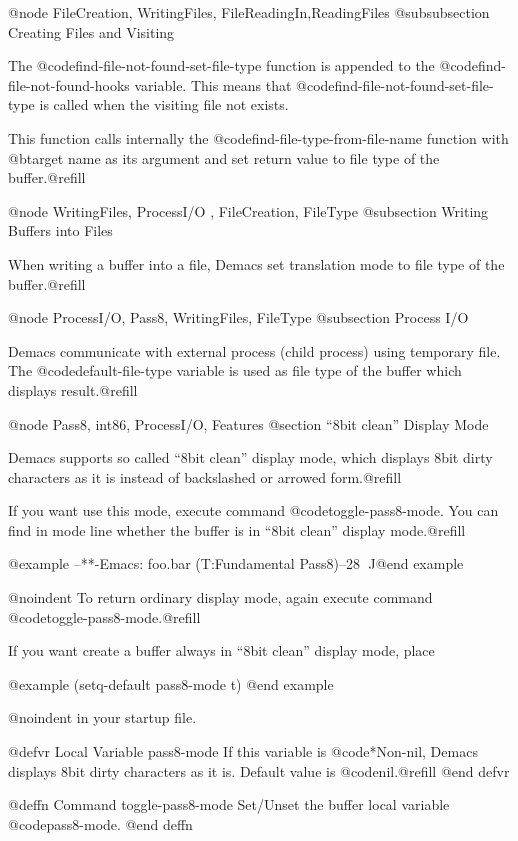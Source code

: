 @node FileCreation, WritingFiles, FileReadingIn,ReadingFiles
@subsubsection Creating Files and Visiting

The @code{find-file-not-found-set-file-type} function is appended to
the @code{find-file-not-found-hooks} variable. This means that
@code{find-file-not-found-set-file-type} is called when the visiting
file not exists.

This function calls internally the @code{find-file-type-from-file-name}
function with @b{target name} as its argument and set return value to
file type of the buffer.@refill


@node WritingFiles, ProcessI/O , FileCreation, FileType
@subsection Writing Buffers into Files

When writing a buffer into a file, Demacs set translation mode to
file type of the buffer.@refill


@node ProcessI/O, Pass8, WritingFiles, FileType
@subsection Process I/O

Demacs communicate with external process (child process) using temporary
file. The @code{default-file-type} variable is used as file type of
the buffer which displays result.@refill


@node Pass8, int86, ProcessI/O, Features
@section ``8bit clean'' Display Mode

Demacs supports so called ``8bit clean'' display mode, which displays
8bit dirty characters as it is instead of backslashed or arrowed
form.@refill

If you want use this mode, execute command @code{toggle-pass8-mode}. You
can find in mode line whether the buffer is in ``8bit clean'' display
mode.@refill

@example
--**-Emacs: foo.bar      (T:Fundamental Pass8)--28%
                                        ^^^^^
@end example

@noindent
To return ordinary display mode, again execute command
@code{toggle-pass8-mode}.@refill

If you want create a buffer always in ``8bit clean'' display mode, place

@example
(setq-default pass8-mode t)
@end example

@noindent
in your startup file.

@defvr {Local Variable} pass8-mode
If this variable is @code{*Non-nil}, Demacs displays 8bit dirty
characters as it is. Default value is @code{nil}.@refill
@end defvr

@deffn Command toggle-pass8-mode
Set/Unset the buffer local variable @code{pass8-mode}.
@end deffn


